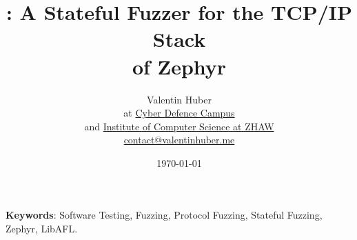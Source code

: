 \documentclass{article}
\title{%
    \vspace{50px}%
    \Huge \proj : A Stateful Fuzzer for the TCP/IP Stack\\of Zephyr
    \vspace{250px}%
}
\author{%
    Valentin Huber\vspace{5px}\\%
    \small at \href{https://www.cydcampus.admin.ch/}{Cyber Defence Campus}\\%
    \small and \href{https://www.zhaw.ch/en/engineering/institutes-centres/init/}{Institute of Computer Science at ZHAW}\\%
    \small \href{mailto://contact@valentinhuber.me}{contact@valentinhuber.me}%
    \vspace{10px}
    \todo{fix title page}
}
\date{\today}
\begin{document}
\maketitle

\clearpage\newpage
\begin{center}
  \begin{minipage}{0.8\textwidth}
    \vspace{70px}

    \begin{abstract}
      \lipsum[1]\lipsum[2]\lipsum[3]
    \end{abstract}
  \end{minipage}

  \vspace{70px}

  \begin{minipage}{0.7\textwidth}
    \textbf{Keywords}: Software Testing, Fuzzing, Protocol Fuzzing, Stateful Fuzzing, Zephyr, LibAFL.
  \end{minipage}
\end{center}

\clearpage\newpage
\end{document}
